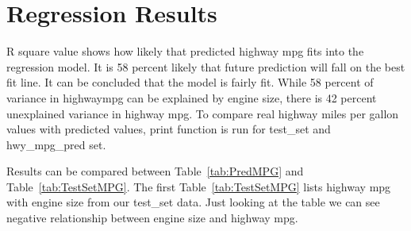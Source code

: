  
\section{Regression Results}

 R square value shows how likely that predicted highway mpg fits into the
 regression model. It is 58 percent likely that future prediction will fall
 on the best fit line. It can be concluded that the model is fairly fit. While 
 58 percent of variance in highwaympg can be explained by engine size,
 there is 42 percent unexplained
 variance in highway mpg. To compare real highway miles per gallon values with 
 predicted values, print function is
 run for test\_set and hwy\_mpg\_pred set.
 
 Results can be compared between Table~\ref{tab:PredMPG} 
 and Table~\ref{tab:TestSetMPG}. 
 The first Table~\ref{tab:TestSetMPG} lists highway mpg with engine size 
 from our test\_set data. Just looking at the table we can see negative 
 relationship between engine size and highway mpg. 
 
